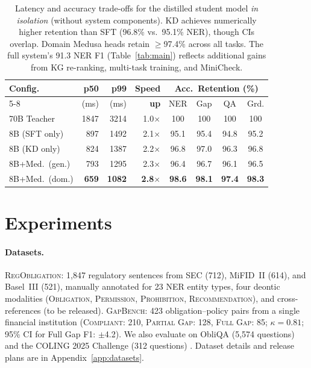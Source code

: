 \documentclass[11pt]{article}
\begin{document}
\begin{table}[t]
\centering
\small
\setlength{\tabcolsep}{2pt}
\begin{tabular}{@{}lrrrcccc@{}}
\toprule
\textbf{Config.} & \textbf{p50} & \textbf{p99} & \textbf{Speed} & \multicolumn{4}{c}{\textbf{Acc.\ Retention (\%)}} \\
\cmidrule(lr){5-8}
 & (ms) & (ms) & \textbf{up} & NER & Gap & QA & Grd. \\
\midrule
70B Teacher & 1847 & 3214 & 1.0$\times$ & 100 & 100 & 100 & 100 \\
8B (SFT only) & 897 & 1492 & 2.1$\times$ & 95.1 & 95.4 & 94.8 & 95.2 \\
8B (KD only) & 824 & 1387 & 2.2$\times$ & 96.8 & 97.0 & 96.3 & 96.8 \\
8B+Med.\ (gen.) & 793 & 1295 & 2.3$\times$ & 96.4 & 96.7 & 96.1 & 96.5 \\
8B+Med.\ (dom.) & \textbf{659} & \textbf{1082} & \textbf{2.8$\times$} & \textbf{98.6} & \textbf{98.1} & \textbf{97.4} & \textbf{98.3} \\
\bottomrule
\end{tabular}
\caption{Latency and accuracy trade-offs for the distilled student model \emph{in isolation} (without system components). KD achieves numerically higher retention than SFT (96.8\% vs.\ 95.1\% NER), though CIs overlap. Domain Medusa heads retain $\geq$97.4\% across all tasks. The full system's 91.3 NER F1 (Table~\ref{tab:main}) reflects additional gains from KG re-ranking, multi-task training, and MiniCheck.}
\label{tab:latency}
\end{table}


\section{Experiments}
\label{sec:experiments}

\paragraph{Datasets.} \textsc{RegObligation}: 1{,}847 regulatory sentences from SEC (712), MiFID~II (614), and Basel~III (521), manually annotated for 23 NER entity types, four deontic modalities (\textsc{Obligation}, \textsc{Permission}, \textsc{Prohibition}, \textsc{Recommendation}), and cross-references (to be released). \textsc{GapBench}: 423 obligation--policy pairs from a single financial institution (\textsc{Compliant}: 210, \textsc{Partial Gap}: 128, \textsc{Full Gap}: 85; $\kappa{=}0.81$; 95\% CI for Full Gap F1: $\pm$4.2). We also evaluate on ObliQA (5{,}574 questions) \citep{gokhan2025regnlp} and the COLING 2025 Challenge (312 questions) \citep{wang2025colingregs}. Dataset details and release plans are in Appendix~\ref{app:datasets}.
\end{document}
